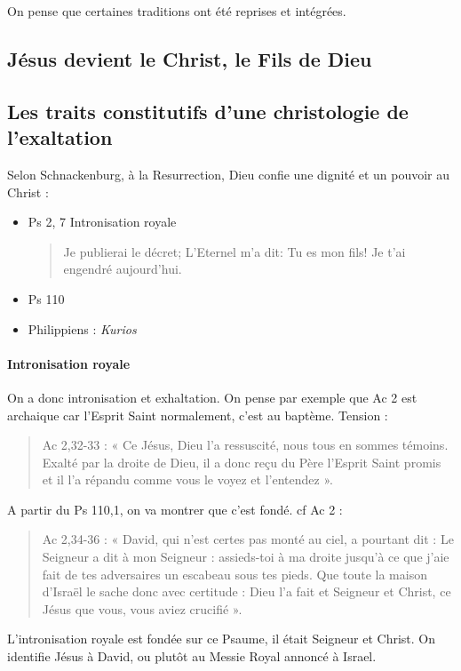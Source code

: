  On pense que certaines traditions ont été reprises et intégrées.
   
     
    \subsection{Jésus devient le Christ, le Fils de Dieu}
     
   
     
    \subsection{Les traits constitutifs d'une christologie de l'exaltation}
     
     Selon Schnackenburg, à la Resurrection, Dieu confie une dignité et un pouvoir au Christ : 
     \begin{itemize}
         \item Ps 2, 7 Intronisation royale
         \begin{quote}
             Je publierai le décret; L'Eternel m'a dit: Tu es mon fils! Je t'ai engendré aujourd'hui. 
         \end{quote}
         \item Ps 110
         \item Philippiens : \emph{Kurios}
     \end{itemize}
     
      \paragraph{Intronisation royale} On a donc intronisation et exhaltation. On pense par exemple que Ac 2 est archaique car l'Esprit Saint normalement, c'est au baptème. Tension : 
\begin{quote}
    Ac 2,32-33 : « Ce Jésus, Dieu l'a ressuscité, nous tous en sommes
témoins. Exalté par la droite de Dieu, il a donc reçu du Père l'Esprit
Saint promis et il l'a répandu comme vous le voyez et l'entendez ».
\end{quote}
A partir du Ps 110,1, on va montrer que c'est fondé. cf Ac 2 : 
\begin{quote}
    
Ac 2,34-36 : « David, qui n'est certes pas monté au ciel, a pourtant dit
: Le Seigneur a dit à mon Seigneur : assieds-toi à ma droite jusqu'à ce
que j'aie fait de tes adversaires un escabeau sous tes pieds. Que toute
la maison d'Israël le sache donc avec certitude : Dieu l'a fait et
Seigneur et Christ, ce Jésus que vous, vous aviez crucifié ».
\end{quote}
L'intronisation royale est fondée sur ce Psaume, il était Seigneur et Christ. On identifie Jésus à David, ou plutôt au Messie Royal annoncé à Israel.


